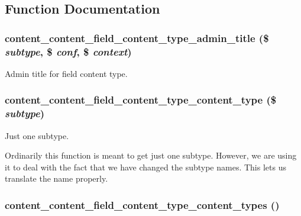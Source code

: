 \subsection{Function Documentation}
\hypertarget{content__field_8inc_cbe550b74a9f2f7158e87ec726115f0d}{
\subsubsection[{content\_\-content\_\-field\_\-content\_\-type\_\-admin\_\-title}]{\setlength{\rightskip}{0pt plus 5cm}content\_\-content\_\-field\_\-content\_\-type\_\-admin\_\-title (\$ {\em subtype}, \/  \$ {\em conf}, \/  \$ {\em context})}}
\label{content__field_8inc_cbe550b74a9f2f7158e87ec726115f0d}


Admin title for field content type. \hypertarget{content__field_8inc_088097e7bf301073fd54ed08020812a8}{
\subsubsection[{content\_\-content\_\-field\_\-content\_\-type\_\-content\_\-type}]{\setlength{\rightskip}{0pt plus 5cm}content\_\-content\_\-field\_\-content\_\-type\_\-content\_\-type (\$ {\em subtype})}}
\label{content__field_8inc_088097e7bf301073fd54ed08020812a8}


Just one subtype.

Ordinarily this function is meant to get just one subtype. However, we are using it to deal with the fact that we have changed the subtype names. This lets us translate the name properly. \hypertarget{content__field_8inc_ce193b46260a22dbea7f033805ba6e7d}{
\subsubsection[{content\_\-content\_\-field\_\-content\_\-type\_\-content\_\-types}]{\setlength{\rightskip}{0pt plus 5cm}content\_\-content\_\-field\_\-content\_\-type\_\-content\_\-types ()}}
\label{content__field_8inc_ce193b46260a22dbea7f033805ba6e7d}


